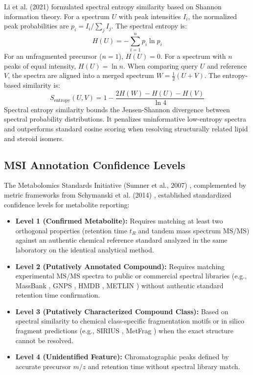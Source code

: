 \documentclass[11pt,twoside,openright]{book}
\begin{document}
Li et al. (2021) \cite{li2021spectral} formulated spectral entropy similarity based on Shannon information theory. For a spectrum $U$ with peak intensities $I_i$, the normalized peak probabilities are $p_i = I_i / \sum_j I_j$. The spectral entropy is:
\begin{equation}
H(U) = -\sum_{i=1}^n p_i \ln p_i
\label{eq:spectral_entropy}
\end{equation}
For an unfragmented precursor ($n = 1$), $H(U) = 0$. For a spectrum with $n$ peaks of equal intensity, $H(U) = \ln n$. When comparing query $U$ and reference $V$, the spectra are aligned into a merged spectrum $W = \frac{1}{2}(U + V)$. The entropy-based similarity is:
\begin{equation}
S_{\text{entropy}}(U, V) = 1 - \frac{2 H(W) - H(U) - H(V)}{\ln 4}
\label{eq:entropy_similarity}
\end{equation}
Spectral entropy similarity bounds the Jensen-Shannon divergence between spectral probability distributions. It penalizes uninformative low-entropy spectra and outperforms standard cosine scoring when resolving structurally related lipid and steroid isomers.

\subsection{MSI Annotation Confidence Levels}
The Metabolomics Standards Initiative (Sumner et al., 2007) \cite{sumner2007proposed}, complemented by metric frameworks from Schymanski et al. (2014) \cite{schymanski2014identifying}, established standardized confidence levels for metabolite reporting:
\begin{itemize}
    \item \textbf{Level 1 (Confirmed Metabolite):} Requires matching at least two orthogonal properties (retention time $t_R$ and tandem mass spectrum $\text{MS/MS}$) against an authentic chemical reference standard analyzed in the same laboratory on the identical analytical method.
    \item \textbf{Level 2 (Putatively Annotated Compound):} Requires matching experimental $\text{MS/MS}$ spectra to public or commercial spectral libraries (e.g., MassBank \cite{horai2010massbank}, GNPS \cite{wang2016sharing}, HMDB \cite{wishart2022hmdb}, METLIN \cite{guijas2018metlin}) without authentic standard retention time confirmation.
    \item \textbf{Level 3 (Putatively Characterized Compound Class):} Based on spectral similarity to chemical class-specific fragmentation motifs or in silico fragment predictions (e.g., SIRIUS \cite{duhrkop2019sirius}, MetFrag \cite{ruttkies2016metfrag}) when the exact structure cannot be resolved.
    \item \textbf{Level 4 (Unidentified Feature):} Chromatographic peaks defined by accurate precursor $m/z$ and retention time without spectral library match.
\end{itemize}
\end{document}
